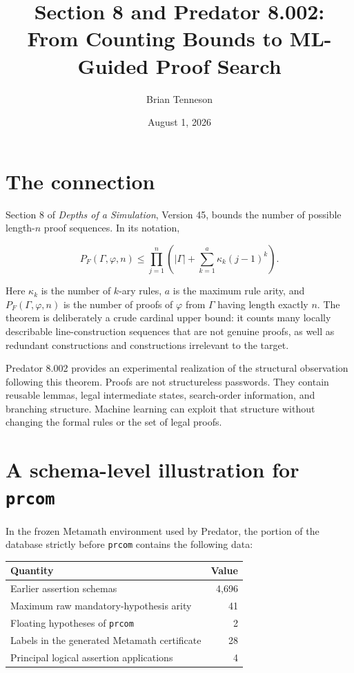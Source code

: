 \documentclass[11pt]{article}
\title{Section 8 and Predator 8.002:\\
From Counting Bounds to ML-Guided Proof Search}
\author{Brian Tenneson}
\date{August 1, 2026}
\newcommand{\prcom}{\texttt{prcom}}
\begin{document}
\maketitle

\section{The connection}

Section 8 of \emph{Depths of a Simulation}, Version 45, bounds the
number of possible length-$n$ proof sequences.  In its notation,

\begin{equation}
P_F(\Gamma,\varphi,n)
\leq
\prod_{j=1}^{n}
\left(
|\Gamma|+\sum_{k=1}^{a}\kappa_k(j-1)^k
\right).
\label{eq:section8-bound}
\end{equation}

Here $\kappa_k$ is the number of $k$-ary rules, $a$ is the maximum
rule arity, and $P_F(\Gamma,\varphi,n)$ is the number of proofs of
$\varphi$ from $\Gamma$ having length exactly $n$.  The theorem is
deliberately a crude cardinal upper bound: it counts many locally
describable line-construction sequences that are not genuine proofs,
as well as redundant constructions and constructions irrelevant to
the target.

Predator 8.002 provides an experimental realization of the structural
observation following this theorem.  Proofs are not structureless
passwords.  They contain reusable lemmas, legal intermediate states,
search-order information, and branching structure.  Machine learning
can exploit that structure without changing the formal rules or the
set of legal proofs.

\section{A schema-level illustration for \prcom}

In the frozen Metamath environment used by Predator, the portion of
the database strictly before \prcom{} contains the following data:

\begin{center}
\begin{tabular}{@{}lr@{}}
\toprule
Quantity & Value \\
\midrule
Earlier assertion schemas & 4,696 \\
Maximum raw mandatory-hypothesis arity & 41 \\
Floating hypotheses of \prcom & 2 \\
Labels in the generated Metamath certificate & 28 \\
Principal logical assertion applications & 4 \\
\bottomrule
\end{tabular}
\end{center}
\end{document}

